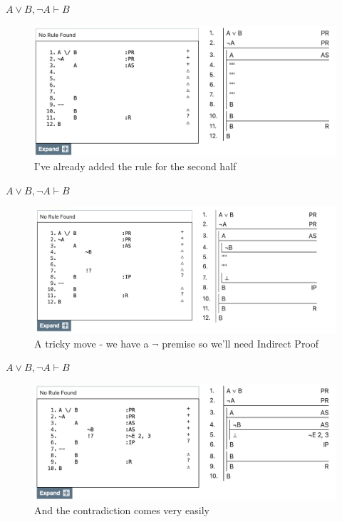 \documentclass[
  ignorenonframetext,
]{beamer}
\renewcommand{\,}{\text{, }}
\begin{document}
\begin{frame}{\(A \vee B, \neg A \vdash B\)}
\protect\hypertarget{a-vee-b-neg-a-vdash-b-2}{}
\begin{figure}
\centering
\includegraphics[width=\textwidth,height=0.75\textheight]{5_6b.png}
\caption{I've already added the rule for the second half}
\end{figure}
\end{frame}

\begin{frame}{\(A \vee B, \neg A \vdash B\)}
\protect\hypertarget{a-vee-b-neg-a-vdash-b-3}{}
\begin{figure}
\centering
\includegraphics[width=\textwidth,height=0.75\textheight]{5_6c.png}
\caption{A tricky move - we have a \(\neg\) premise so we'll need
Indirect Proof}
\end{figure}
\end{frame}

\begin{frame}{\(A \vee B, \neg A \vdash B\)}
\protect\hypertarget{a-vee-b-neg-a-vdash-b-4}{}
\begin{figure}
\centering
\includegraphics[width=\textwidth,height=0.75\textheight]{5_6d.png}
\caption{And the contradiction comes very easily}
\end{figure}
\end{frame}
\end{document}

